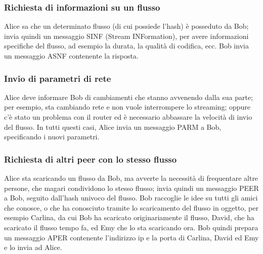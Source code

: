 \subsubsection{Richiesta di informazioni su un flusso}
%

Alice sa che un determinato flusso (di cui possiede l'hash) è posseduto da Bob; invia quindi un messaggio SINF (Stream INFormation), per avere informazioni specifiche del flusso, ad esempio la durata, la qualità di codifica, ecc. Bob invia un messaggio ASNF contenente la risposta.






\subsubsection{Invio di parametri di rete}
%

Alice deve informare Bob di cambiamenti che stanno avvenendo dalla sua parte; per esempio, sta cambiando rete e non vuole interrompere lo streaming; oppure c'è stato un problema con il router ed è necessario abbassare la velocità di invio del flusso. In tutti questi casi, Alice invia un messaggio PARM a Bob, specificando i nuovi parametri.






\subsubsection{Richiesta di altri peer con lo stesso flusso}
%

Alice sta scaricando un flusso da Bob, ma avverte la necessità di frequentare altre persone, che magari condividono lo stesso flusso; invia quindi un messaggio PEER a Bob, seguito dall'hash univoco del flusso. Bob raccoglie le idee su tutti gli amici che conosce, o che ha conosciuto tramite lo scaricamento del flusso in oggetto, per esempio Carlina, da cui Bob ha scaricato originariamente il flusso, David, che ha scaricato il flusso tempo fa, ed Emy che lo sta scaricando ora. Bob quindi prepara un messaggio APER contenente l'indirizzo ip e la porta di Carlina, David ed Emy e lo invia ad Alice.









